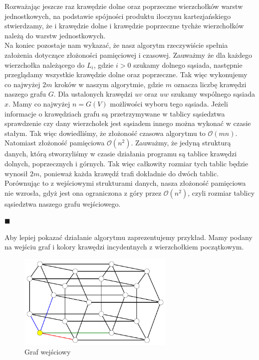 \documentclass[12pt,a4paper,titlepage]{article}
\newcommand\tab[1][1cm]{\hspace*{#1}}
\begin{document}
Rozważając jeszcze raz krawędzie dolne oraz poprzeczne wierzchołków warstw jednostkowych, na podstawie spójności produktu iloczynu kartezjańskiego stwierdzamy, że i krawędzie dolne i krawędzie poprzeczne tychże wierzchołków należą do warstw jednostkowych.\\

Na koniec pozostaje nam wykazać, że nasz algorytm rzeczywiście spełnia założenia dotyczące złożoności pamięciowej i czasowej. Zauważmy że dla każdego wierzchołka należącego do $L_i$, gdzie $i>0$ szukamy dolnego sąsiada, następnie przeglądamy wszystkie krawędzie dolne oraz poprzeczne. Tak więc wykonujemy co najwyżej $2m$ kroków w naszym algorytmie, gdzie $m$ oznacza liczbę krawędzi naszego grafu $G$. Dla ustalonych krawędzi $uv$ oraz $uw$ szukamy wspólnego sąsiada $x$. Mamy co najwyżej $n=G(V)$ możliwości wyboru tego sąsiada. Jeżeli informacje o krawędziach grafu są przetrzymywane w tablicy sąsiedztwa sprawdzenie czy dany wierzchołek jest sąsiadem innego można wykonać w czasie stałym. Tak więc dowiedliśmy, że złożoność czasowa algorytmu to $\mathcal{O}(mn)$. Natomiast złożoność pamięciowa $\mathcal{O}(n^2)$. Zauważmy, że jedyną strukturą danych, którą stworzyliśmy w czasie działania programu są tablice krawędzi dolnych, poprzecznych i górnych. Tak więc całkowity rozmiar tych tablic będzie wynosił $2m$, ponieważ każda krawędź trafi dokładnie do dwóch tablic. Porównując to z wejściowymi strukturami danych, nasza złożoność pamięciowa nie wzrosła, gdyż jest ona ograniczona z góry przez $\mathcal{O}(n^2)$, czyli rozmiar tablicy sąsiedztwa naszego grafu wejściowego. 
\begin{flushright}
$\blacksquare$
\end{flushright}
\newpage
\tab[0.6cm]Aby lepiej pokazać działanie algorytmu zaprezentujemy przykład. Mamy podany na wejściu graf i kolory krawędzi incydentnych z wierzchołkiem początkowym.
\begin{figure}[h]
\centering
\includegraphics[width = 7.5cm]{kol1.png}
\caption{Graf wejściowy}
\end{figure}
\\
\end{document}
